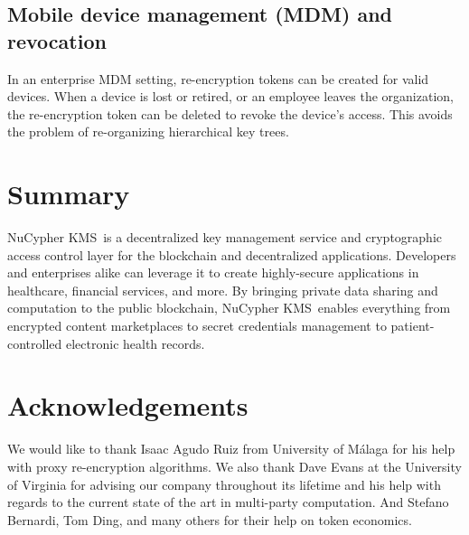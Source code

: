 \documentclass[longbibliography,nofootinbib]{revtex4-1}
\newcommand{\kms}{NuCypher KMS}
\begin{document}
\subsection{Mobile device management (MDM) and revocation}
\label{sec:mdm}
In an enterprise MDM setting, re-encryption tokens can be created for valid devices. When a device is lost or retired,
or an employee leaves the organization, the re-encryption token can be deleted to revoke the device's access. This avoids the
problem of re-organizing hierarchical key trees.

\section{Summary}
\kms~is a decentralized key management service and cryptographic access control layer for the blockchain and
decentralized applications.
Developers and enterprises alike can leverage it to create highly-secure applications in healthcare,
financial services, and more.
By bringing private data sharing and computation to the public blockchain, \kms~enables everything from encrypted
content marketplaces to secret credentials management to patient-controlled electronic health records.

\section{Acknowledgements}
We would like to thank Isaac Agudo Ruiz from University of M{\'a}laga
for his help with proxy re-encryption algorithms.
We also thank Dave Evans at the University of Virginia for advising our company throughout its lifetime
and his help with regards to the current state of the art in multi-party computation.
And Stefano Bernardi, Tom Ding, and many others for their help on token economics.


\end{document}
